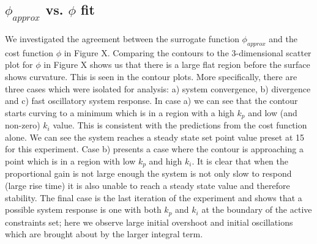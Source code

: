 \documentclass[conference]{IEEEtran}
\theoremstyle{definition}
\begin{document}
\subsection{$\phi_{approx}$ vs. $\phi$ fit }
We investigated the agreement between the surrogate function $\phi_{approx}$ and the cost function $\phi$ in Figure X. Comparing the contours to the 3-dimensional scatter plot for $\phi$ in Figure X shows us that there is a large flat region before the surface shows curvature. This is seen in the contour plots. More specifically, there are three cases which were isolated for analysis: a) system convergence, b) divergence and c) fast oscillatory system response. In case a) we can see that the contour starts curving to a minimum which is in a region with a high $k_p$ and low (and non-zero) $k_i$ value. This is consistent with the predictions from the cost function alone. We can see the system reaches a steady state set point value preset at 15 for this experiment. Case b) presents a case where the contour is approaching a point which is in a region with low $k_p$ and high $k_i$. It is clear that when the proportional gain is not large enough the system is not only slow to respond (large rise time) it is also unable to reach a steady state value and therefore stability. The final case is the last iteration of the experiment and shows that a possible system response is one with both $k_p$ and $k_i$ at the boundary of the active constraints set; here we observe large initial overshoot and initial oscillations which are brought about by the larger integral term. 
\end{document}
